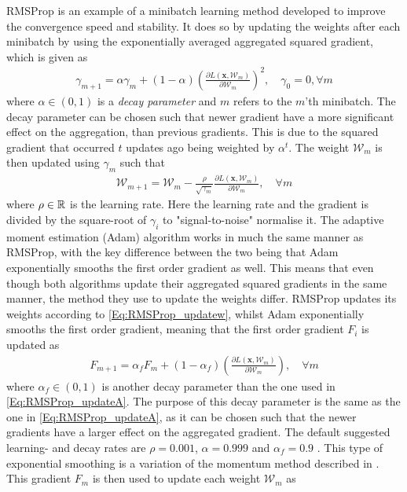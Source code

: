 RMSProp is an example of a minibatch learning method developed to improve the convergence speed and stability. It does so by updating the weights after each minibatch by using the exponentially averaged aggregated squared gradient, which is given as
\begin{align}\label{Eq:RMSProp_updateA}
    \gamma_{m+1} = \alpha \gamma_m + \left(1-\alpha\right)\left(\frac{\partial L(\bm{x}, \mathcal{W}_m)}{\partial \mathcal{W}_m}\right)^2,\quad \gamma_0=0, \forall m
\end{align}
where $\alpha\in(0,1)$ is a \emph{decay parameter} and $m$ refers to the $m$'th minibatch. The decay parameter can be chosen such that newer gradient have a more significant effect on the aggregation, than previous gradients. This is due to the squared gradient that occurred $t$ updates ago being weighted by $\alpha^t$. The weight $\mathcal{W}_m$ is then updated using $\gamma_m$ such that
\begin{align}\label{Eq:RMSProp_updatew}
    \mathcal{W}_{m+1} = \mathcal{W}_{m} - \frac{\rho}{\sqrt{\gamma_m}} \frac{\partial L(\bm{x}, \mathcal{W}_m)}{\partial \mathcal{W}_m},\quad\forall m
\end{align}
where $\rho\in\mathbb{R}$ is the learning rate. Here the learning rate and the gradient is divided by the square-root of $\gamma_i$ to "signal-to-noise" normalise it. The adaptive moment estimation (Adam) algorithm works in much the same manner as RMSProp, with the key difference between the two being that Adam exponentially smooths the first order gradient as well. This means that even though both algorithms update their aggregated squared gradients in the same manner, the method they use to update the weights differ. RMSProp updates its weights according to \eqref{Eq:RMSProp_updatew}, whilst Adam exponentially smooths the first order gradient, meaning that the first order gradient $F_i$ is updated as
\begin{align}\label{Eq:Adam_updateF}
    F_{m+1} = \alpha_fF_m + \left(1-\alpha_f\right)\left(\frac{\partial L(\bm{x}, \mathcal{W}_m)}{\partial \mathcal{W}_m}\right),\quad\forall m
\end{align}
where $\alpha_f\in(0,1)$ is another decay parameter than the one used in \eqref{Eq:RMSProp_updateA}. The purpose of this decay parameter is the same as the one in \eqref{Eq:RMSProp_updateA}, as it can be chosen such that the newer gradients have a larger effect on the aggregated gradient. The default suggested learning- and decay rates are $\rho=0.001$, $\alpha=0.999$ and $\alpha_f=0.9$ \citep[p. 141]{NN}. This type of exponential smoothing is a variation of the momentum method described in \citep{NN}. This gradient $F_m$ is then used to update each weight $\mathcal{W}_{m}$ as
